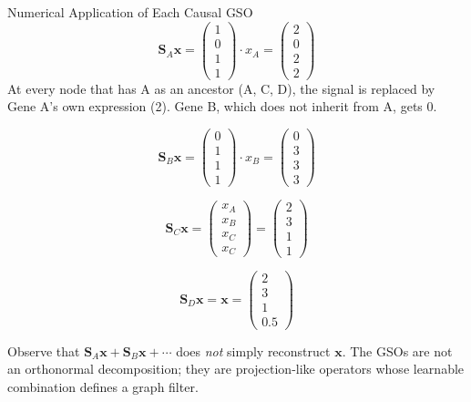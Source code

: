 \begin{examplebox}{Numerical Application of Each Causal GSO}
\[
    \mathbf{S}_A \mathbf{x} = \begin{pmatrix}1\\0\\1\\1\end{pmatrix} \cdot x_A
    = \begin{pmatrix}2\\0\\2\\2\end{pmatrix}
\]
At every node that has A as an ancestor (A, C, D), the signal is replaced by
Gene A's own expression (2). Gene B, which does not inherit from A, gets 0.

\[
    \mathbf{S}_B \mathbf{x} = \begin{pmatrix}0\\1\\1\\1\end{pmatrix} \cdot x_B
    = \begin{pmatrix}0\\3\\3\\3\end{pmatrix}
\]

\[
    \mathbf{S}_C \mathbf{x} = \begin{pmatrix}x_A \\ x_B \\ x_C \\ x_C\end{pmatrix}
    = \begin{pmatrix}2\\3\\1\\1\end{pmatrix}
\]

\[
    \mathbf{S}_D \mathbf{x} = \mathbf{x} = \begin{pmatrix}2\\3\\1\\0.5\end{pmatrix}
\]

Observe that $\mathbf{S}_A\mathbf{x} + \mathbf{S}_B\mathbf{x} + \cdots$ does
\emph{not} simply reconstruct $\mathbf{x}$. The GSOs are not an orthonormal
decomposition; they are projection-like operators whose learnable combination
defines a graph filter.
\end{examplebox}


